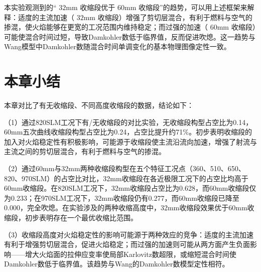本实验观测到的“ \(32\mathrm{mm}\) 收缩段优于 \(60\mathrm{mm}\) 收缩段”的趋势，可以用上述框架来解释：适度的主流加速（ \(32\mathrm{mm}\) 收缩段）增强了剪切层混合，有利于燃料与空气的掺混，使火焰能够在更宽的工况范围内维持稳定；而过强的加速（ \(60\mathrm{mm}\) 收缩段）可能使混合时间过短，导致Damkohler数低于临界值，反而促进吹熄。这一趋势与Wang模型中Damkohler数随混合时间单调变化的基本物理图像定性一致。

\section{本章小结}

本章对比了有无收缩段、不同高度收缩段的数据，结论如下：

（1）通过820SLM工况下有/无收缩段的对比实验，无收缩段构型占空比为0.14，60mm五次曲线收缩段构型占空比为0.24，占空比提升约71\%。初步表明收缩段的加入对火焰稳定性有积极影响，可能源于收缩段使主流沿流向加速，增强了射流与主流之间的剪切层混合，有利于燃料与空气的掺混。

（2）通过60mm与32mm两种收缩段构型在五个特征工况点（360、510、650、820、970SLM）的占空比对比，32mm收缩段在各近极限工况下的占空比均高于60mm收缩段。在820SLM工况下，32mm收缩段占空比为0.628，而60mm收缩段仅为0.233；在970SLM工况下，32mm收缩段仍有0.277，而60mm收缩段已降至0.000，完全吹熄。在实验涉及的两种收缩高度中，32mm收缩段效果优于60mm收缩段，初步表明存在一个最优收缩比范围。

（3）收缩段高度对火焰稳定性的影响可能源于两种效应的竞争：适度的主流加速有利于增强剪切层混合，促进火焰稳定；而过强的加速则可能从两方面产生负面影响——增大火焰面的拉伸应变率使局部Karlovitz数超限，或缩短混合时间使Damkohler数低于临界值。该趋势与Wang的Damkohler数模型定性相符。